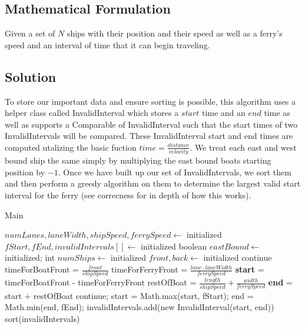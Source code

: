 \documentclass[12pt]{article}
\begin{document}
\subsection{Mathematical Formulation}
Given a set of $N$ ships with their position and their speed as well as a ferry's speed and an interval of time that
it can begin traveling.

\newpage

\subsection{Solution}
To store our important data and ensure sorting is possible, this algorithm uses a helper class called InvalidInterval
which stores a $start$ time and an $end$ time as well as supports a Comparable of InvalidInterval such that the start times
of two InvalidIntervals will be compared. These InvalidInterval start and end times are computed utalizing the basic
fuction $time = \frac{distance}{velocity}$. We treat each east and west bound ship the same simply by multiplying the
east bound boats starting position by $-1$. Once we have built up our set of InvalidIntervals, we sort them and then
perform a greedy algorithm on them to determine the largest valid start interval for the ferry (see correcness for
in depth of how this works).

\begin{algorithm}[H]
\caption{Main}
\begin{algorithmic}
            \State $numLanes, laneWidth, shipSpeed, ferrySpeed \gets$ initialized
            \State $fStart, fEnd, invalidIntervals[] \gets$ initialized
                \State boolean $eastBound \gets$ initialized; int $numShips \gets$ initialized
                    \State $front, back \gets$ initialized
                        continue
                    \EndIf
                    \State timeForBoatFront = $\frac{front}{shipSpeed}$
                    \State timeForFerryFront = $\frac{lane\cdot laneWidth}{ferrySpeed}$
                    \State \textbf{start} = timeForBoatFront - timeForFerryFront
                    \State restOfBoat = $\frac{length}{shipSpeed} + \frac{width}{ferrySpeed}$
                    \State \textbf{end} = start + restOfBoat
                        continue;
                    \EndIf
                    \State start = Math.max(start, fStart);
                    \State end = Math.min(end, fEnd);
                    \State invalidIntervals.add(new InvalidInterval(start, end))
                \EndFor
            \EndFor
        \EndFor
        \State sort(invalidIntervals)
        \State {}
    \EndProcedure
\end{algorithmic}
\end{algorithm}
\end{document}
